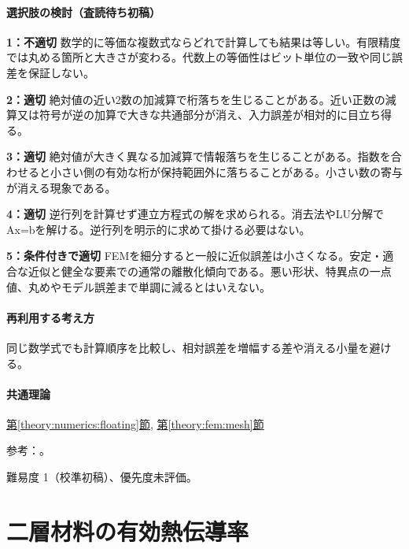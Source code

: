 \paragraph{選択肢の検討（査読待ち初稿）}\mbox{}\par

\noindent\textbf{1：不適切} 数学的に等価な複数式ならどれで計算しても結果は等しい。有限精度では丸める箇所と大きさが変わる。代数上の等価性はビット単位の一致や同じ誤差を保証しない。\par

\noindent\textbf{2：適切} 絶対値の近い2数の加減算で桁落ちを生じることがある。近い正数の減算又は符号が逆の加算で大きな共通部分が消え、入力誤差が相対的に目立ち得る。\par

\noindent\textbf{3：適切} 絶対値が大きく異なる加減算で情報落ちを生じることがある。指数を合わせると小さい側の有効な桁が保持範囲外に落ちることがある。小さい数の寄与が消える現象である。\par

\noindent\textbf{4：適切} 逆行列を計算せず連立方程式の解を求められる。消去法やLU分解でAx=\allowbreak{}bを解ける。逆行列を明示的に求めて掛ける必要はない。\par

\noindent\textbf{5：条件付きで適切} FEMを細分すると一般に近似誤差は小さくなる。安定・適合な近似と健全な要素での通常の離散化傾向である。悪い形状、特異点の一点値、丸めやモデル誤差まで単調に減るとはいえない。\par

\paragraph{再利用する考え方} 同じ数学式でも計算順序を比較し、相対誤差を増幅する差や消える小量を避ける。

\paragraph{共通理論} \hyperref[theory:numerics:floating]{第\ref*{theory:numerics:floating}節}, \hyperref[theory:fem:mesh]{第\ref*{theory:fem:mesh}節}

\par 参考：\cite{goldberg1991,mit_roy_fea1999}。

\par 難易度 1（校準初稿）、優先度未評価。

\section{二層材料の有効熱伝導率}

